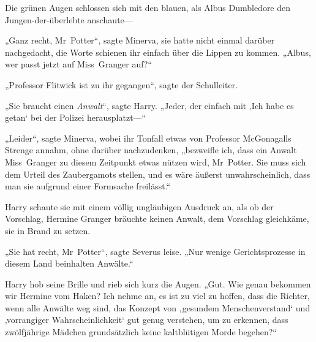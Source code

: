 Die grünen Augen schlossen sich mit den blauen, als Albus Dumbledore den Jungen-der-überlebte anschaute—

„Ganz recht, Mr~Potter“, sagte Minerva, sie hatte nicht einmal darüber nachgedacht, die Worte schienen ihr einfach über die Lippen zu kommen. „Albus, wer passt jetzt auf Miss~Granger auf?“

„Professor Flitwick ist zu ihr gegangen“, sagte der Schulleiter.

„Sie braucht einen \emph{Anwalt}“, sagte Harry. „Jeder, der einfach mit ‚Ich habe es getan‘ bei der Polizei herausplatzt—“

„Leider“, sagte Minerva, wobei ihr Tonfall etwas von Professor McGonagalls Strenge annahm, ohne darüber nachzudenken, „bezweifle ich, dass ein Anwalt Miss~Granger zu diesem Zeitpunkt etwas nützen wird, Mr~Potter. Sie muss sich dem Urteil des Zaubergamots stellen, und es wäre äußerst unwahrscheinlich, dass man sie aufgrund einer Formsache freilässt.“

Harry schaute sie mit einem völlig ungläubigen Ausdruck an, als ob der Vorschlag, Hermine Granger bräuchte keinen Anwalt, dem Vorschlag gleichkäme, sie in Brand zu setzen.

„Sie hat recht, Mr~Potter“, sagte Severus leise. „Nur wenige Gerichtsprozesse in diesem Land beinhalten Anwälte.“

Harry hob seine Brille und rieb sich kurz die Augen.
„Gut. Wie genau bekommen wir Hermine vom Haken? Ich nehme an, es ist zu viel zu hoffen, dass die Richter, wenn alle Anwälte weg sind, das Konzept von ‚gesundem Menschenverstand‘ und ‚vorrangiger Wahrscheinlichkeit‘ gut genug verstehen, um zu erkennen, dass zwölfjährige Mädchen grundsätzlich keine kaltblütigen Morde begehen?“

